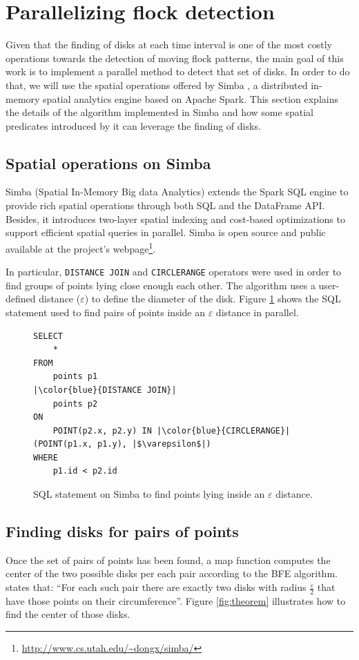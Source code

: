 \documentclass[12pt]{scrartcl}
\begin{document}
\section{Parallelizing flock detection}\label{sec:flock}
Given that the finding of disks at each time interval is one of the most costly operations towards the detection of moving flock patterns, the main goal of this work is to implement a parallel method to detect that set of disks.  In order to do that, we will use the spatial operations offered by Simba \cite{xie_simba:_2016-1}, a distributed in-memory spatial analytics engine based on Apache Spark. This section explains the details of the algorithm implemented in Simba and how some spatial predicates introduced by it can leverage the finding of disks.

\subsection{Spatial operations on Simba}
Simba (Spatial In-Memory Big data Analytics) extends the Spark SQL engine to provide rich spatial operations through both SQL and the DataFrame API.  Besides, it introduces two-layer spatial indexing and cost-based optimizations to support efficient spatial queries in parallel.  Simba is open source and public available at the project's webpage\footnote{\url{http://www.cs.utah.edu/~dongx/simba/}}.

In particular, \texttt{DISTANCE JOIN} and \texttt{CIRCLERANGE} operators were used in order to find groups of points lying close enough each other.  The algorithm uses a user-defined distance ($\varepsilon$) to define the diameter of the disk.  Figure \ref{fig:sql} shows the SQL statement used to find pairs of points inside an $\varepsilon$ distance in parallel.

\begin{figure}
 \centering
    \begin{verbatim}
SELECT 
	* 
FROM 
	points p1
|\color{blue}{DISTANCE JOIN}|
	points p2 
ON 
	POINT(p2.x, p2.y) IN |\color{blue}{CIRCLERANGE}|(POINT(p1.x, p1.y), |$\varepsilon$|)
WHERE 
	p1.id < p2.id
    \end{verbatim}
 \caption{SQL statement on Simba to find points lying inside an $\varepsilon$ distance.}
 \label{fig:sql}
\end{figure}

\subsection{Finding disks for pairs of points}
Once the set of pairs of points has been found, a map function computes the center of the two possible disks per each pair according to the BFE algorithm.  \cite{vieira_-line_2009} states that:  ``For each such pair there are exactly two disks with radius $\frac{\varepsilon}{2}$ that have those points on their circumference''.  Figure \ref{fig:theorem} illustrates how to find the center of those disks.
\end{document}
